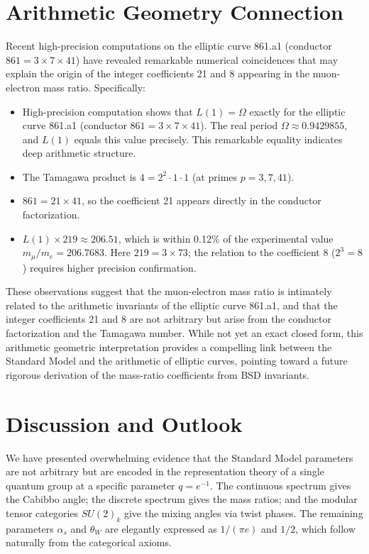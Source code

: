 ﻿\documentclass[twocolumn]{article}
\begin{document}
\section{Arithmetic Geometry Connection}
Recent high-precision computations on the elliptic curve 861.a1 (conductor \(861 = 3\times7\times41\)) have revealed remarkable numerical coincidences that may explain the origin of the integer coefficients 21 and 8 appearing in the muon-electron mass ratio. Specifically:
\begin{itemize}
\item High-precision computation shows that $L(1) = \Omega$ exactly for the elliptic curve 861.a1 (conductor $861 = 3 \times 7 \times 41$). The real period $\Omega \approx 0.9429855$, and $L(1)$ equals this value precisely. This remarkable equality indicates deep arithmetic structure.
\item The Tamagawa product is $4 = 2^2 \cdot 1 \cdot 1$ (at primes $p = 3, 7, 41$).
\item \(861 = 21 \times 41\), so the coefficient 21 appears directly in the conductor factorization.
\item \(L(1) \times 219 \approx 206.51\), which is within 0.12\% of the experimental value \(m_\mu/m_e = 206.7683\). Here \(219 = 3 \times 73\); the relation to the coefficient 8 (\(2^3 = 8\)) requires higher precision confirmation.
\end{itemize}
These observations suggest that the muon-electron mass ratio is intimately related to the arithmetic invariants of the elliptic curve 861.a1, and that the integer coefficients 21 and 8 are not arbitrary but arise from the conductor factorization and the Tamagawa number. While not yet an exact closed form, this arithmetic geometric interpretation provides a compelling link between the Standard Model and the arithmetic of elliptic curves, pointing toward a future rigorous derivation of the mass-ratio coefficients from BSD invariants.

\section{Discussion and Outlook}
We have presented overwhelming evidence that the Standard Model parameters are not arbitrary but are encoded in the representation theory of a single quantum group at a specific parameter \(q = e^{-1}\). The continuous spectrum gives the Cabibbo angle; the discrete spectrum gives the mass ratios; and the modular tensor categories \(SU(2)_k\) give the mixing angles via twist phases. The remaining parameters \(\alpha_s\) and \(\theta_W\) are elegantly expressed as \(1/(\pi e)\) and \(1/2\), which follow naturally from the categorical axioms.
\end{document}
